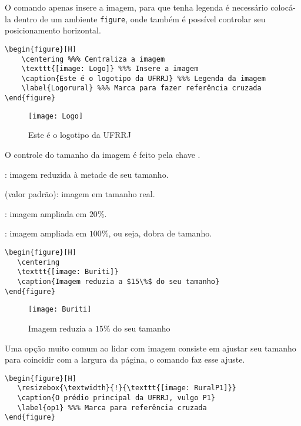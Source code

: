 O comando  apenas insere 
a imagem, para que tenha legenda é necessário colocá-la 
dentro de um ambiente \verb|figure|, onde também é 
possível controlar seu posicionamento horizontal.
\begin{tcolorbox}
\begin{lstlisting}
\begin{figure}[H]
    \centering %%% Centraliza a imagem
    \texttt{[image: Logo]} %%% Insere a imagem
    \caption{Este é o logotipo da UFRRJ} %%% Legenda da imagem
    \label{Logorural} %%% Marca para fazer referência cruzada
\end{figure}
\end{lstlisting}
\end{tcolorbox}
\begin{figure}[H]
	\centering %
	\texttt{[image: Logo]}
	\caption{Este é o logotipo da UFRRJ} %
	\label{Logorural} %
\end{figure}

O controle do tamanho da imagem é feito pela chave .

: imagem reduzida à metade de seu tamanho.

 (valor padrão): imagem em tamanho real.

: imagem ampliada em $20\%$.

: imagem ampliada em $100\%$, ou seja, dobra de tamanho.

\begin{tcolorbox}
\begin{lstlisting}
\begin{figure}[H]
   \centering
   \texttt{[image: Buriti]}
   \caption{Imagem reduzia a $15\%$ do seu tamanho}
\end{figure}
\end{lstlisting}
\end{tcolorbox}

\begin{figure}[H]
   \centering
   \texttt{[image: Buriti]}
   \caption{Imagem reduzia a $15\%$ do seu tamanho}
   \label{primeira}
\end{figure}

Uma opção muito comum ao lidar com imagem consiste em 
ajustar seu tamanho para coincidir com a largura da 
página, o comando  faz esse ajuste.
\begin{tcolorbox}
\begin{lstlisting}
\begin{figure}[H]
   \resizebox{\textwidth}{!}{\texttt{[image: RuralP1]}}
   \caption{O prédio principal da UFRRJ, vulgo P1}
   \label{op1} %%% Marca para referência cruzada
\end{figure}
\end{lstlisting}
\end{tcolorbox}

